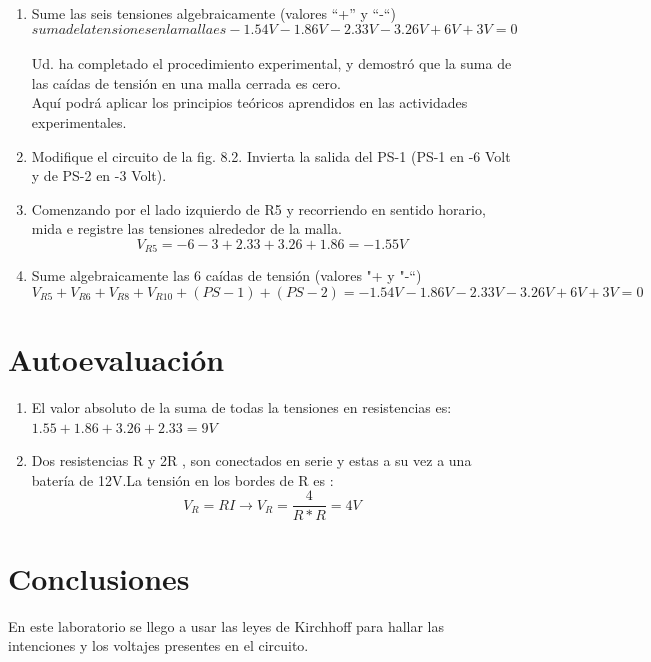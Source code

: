 \begin{enumerate}
\begin{figure}[h]
	\end{figure}
	\item Sume las seis tensiones algebraicamente (valores “+” y “-“) 
	\begin{equation*}
		suma de la tensiones en la malla es -1.54V-1.86V-2.33V-3.26V+6V+3V=0 
	\end{equation*}
	\\
	Ud. ha completado el procedimiento experimental, y demostró que la suma de las caídas de tensión en una malla cerrada es cero.\\
	Aquí podrá aplicar los principios teóricos aprendidos en las actividades experimentales.
	\item Modifique el circuito de la fig. 8.2. Invierta la salida del PS-1 (PS-1 en -6 Volt y de PS-2 en -3 Volt).
	\item Comenzando por el lado izquierdo de R5 y recorriendo en sentido horario, mida e registre las tensiones alrededor de la malla. 
	\begin{equation*}
		V_{R5}= -6-3+2.33+3.26+1.86=-1.55V
	\end{equation*}
	\item Sume algebraicamente las 6 caídas de tensión (valores "+ y "-“)
	\begin{equation*}
		V_{R5}+V_{R6}+V_{R8}+V_{R10}+(PS-1)+(PS-2)= -1.54V-1.86V-2.33V-3.26V+6V+3V=0
	\end{equation*}
\end{enumerate}
\section{Autoevaluación}
\begin{enumerate}
	\item 	El valor absoluto de la suma de todas la tensiones en resistencias es:\\ 
	$1.55+1.86+3.26+2.33=9V$
	\item Dos resistencias R y 2R , son conectados en serie y estas a su vez a una batería de 12V.La tensión en los bordes de R es : 
	\begin{equation*}
		V_{R}=RI \rightarrow V_{R}=\frac{4}{R*R}=4V
	\end{equation*}
\end{enumerate}
\section{Conclusiones}
En este laboratorio se llego a usar las leyes de Kirchhoff para hallar las intenciones y los voltajes presentes en el circuito.
